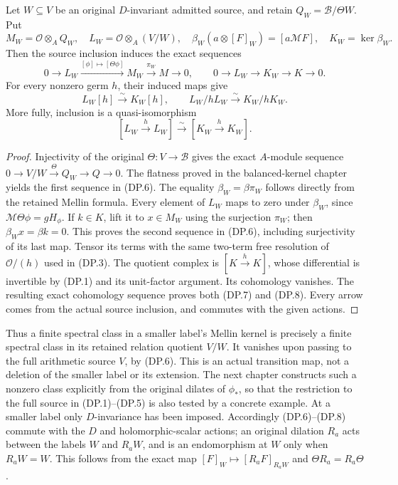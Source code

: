 \begin{proposition}
Let $W\subseteq V$ be an original $D$-invariant admitted source,
and retain $Q_W=\mathscr B/\Theta W$. Put
\[
 M_W=\mathscr O\otimes_AQ_W,\quad
 L_W=\mathscr O\otimes_A(V/W),\quad
 \beta_W(a\otimes[F]_W)=[a\mathcal MF],\quad K_W=\ker\beta_W.
\]
Then the source inclusion induces the exact sequences
\[
 0\longrightarrow L_W\xrightarrow{[\phi]\mapsto[\Theta\phi]}
 M_W\xrightarrow{\pi_W}M\longrightarrow0,\qquad
 0\longrightarrow L_W\longrightarrow K_W\longrightarrow K
 \longrightarrow0.                                    \tag{DP.6}
\]
For every nonzero germ $h$, their induced maps give
\[
 L_W[h]\xrightarrow{\sim}K_W[h],\qquad
 L_W/hL_W\xrightarrow{\sim}K_W/hK_W.                 \tag{DP.7}
\]
More fully, inclusion is a quasi-isomorphism
\[
 [L_W\xrightarrow{h}L_W]\xrightarrow{\sim}
 [K_W\xrightarrow{h}K_W].                              \tag{DP.8}
\]
\end{proposition}
\begin{proof}
Injectivity of the original $\Theta:V\to\mathscr B$ gives the
exact $A$-module sequence
$0\to V/W\xrightarrow{\Theta}Q_W\to Q\to0$. The flatness
proved in the balanced-kernel chapter yields the first sequence
in (DP.6). The equality $\beta_W=\beta\pi_W$ follows directly
from the retained Mellin formula. Every element of $L_W$ maps to
zero under $\beta_W$, since $\mathcal M\Theta\phi=gH_\phi$.
If $k\in K$, lift it to $x\in M_W$ using the surjection
$\pi_W$; then $\beta_Wx=\beta k=0$. This proves the second
sequence in (DP.6), including surjectivity of its last map.
Tensor its terms with the same two-term free resolution of
$\mathscr O/(h)$ used in (DP.3). The quotient complex is
$[K\xrightarrow{h}K]$, whose differential is invertible by
(DP.1) and its unit-factor argument. Its cohomology vanishes.
The resulting exact cohomology sequence proves both (DP.7) and
(DP.8). Every arrow comes from the actual source inclusion, and
commutes with the given actions.
\end{proof}

Thus a finite spectral class in a smaller label's Mellin kernel
is precisely a finite spectral class in its retained relation
quotient $V/W$. It vanishes upon passing to the full arithmetic
source $V$, by (DP.6). This is an actual transition map, not a
deletion of the smaller label or its extension. The next chapter
constructs such a nonzero class explicitly from the original
dilates of $\phi_*$, so that the restriction to the full source in
(DP.1)--(DP.5) is also tested by a concrete example. At a smaller
label only $D$-invariance has been imposed. Accordingly (DP.6)--(DP.8)
commute with the $D$ and holomorphic-scalar actions; an original
dilation $R_a$ acts between the labels $W$ and $R_aW$, and is an
endomorphism at $W$ only when $R_aW=W$. This follows from the exact
map $[F]_W\mapsto[R_aF]_{R_aW}$ and $\Theta R_a=R_a\Theta$.
